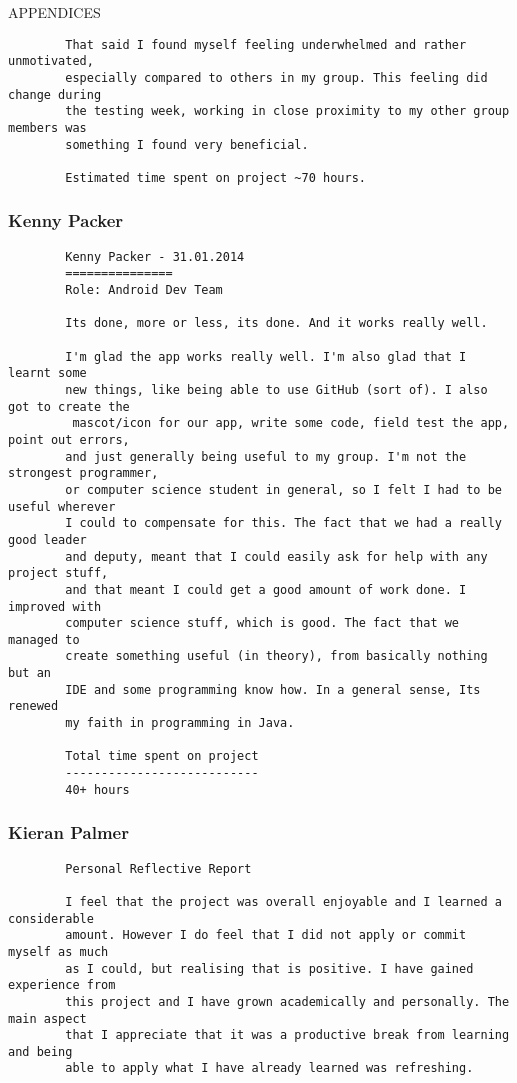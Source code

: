 \documentclass{article}
\begin{document}
\begin{section}{APPENDICES}
\begin{verbatim}
		That said I found myself feeling underwhelmed and rather unmotivated, 
		especially compared to others in my group. This feeling did change during 
		the testing week, working in close proximity to my other group members was 
		something I found very beneficial.

		Estimated time spent on project ~70 hours.

		\end{verbatim}
		
		\clearpage
		\subsubsection{Kenny Packer}
		\begin{verbatim}
		Kenny Packer - 31.01.2014
		===============
		Role: Android Dev Team

		Its done, more or less, its done. And it works really well.

		I'm glad the app works really well. I'm also glad that I learnt some 
		new things, like being able to use GitHub (sort of). I also got to create the
		 mascot/icon for our app, write some code, field test the app, point out errors,
		and just generally being useful to my group. I'm not the strongest programmer, 
		or computer science student in general, so I felt I had to be useful wherever 
		I could to compensate for this. The fact that we had a really good leader 
		and deputy,	meant that I could easily ask for help with any project stuff, 
		and that meant I could get a good amount of work done. I improved with 
		computer science stuff, which is good. The fact that we managed to 
		create something useful (in theory), from basically nothing but an 
		IDE and some programming know how. In a general sense, Its renewed 
		my faith in programming in Java. 
		
		Total time spent on project
		---------------------------
		40+ hours
		\end{verbatim}
		
		\clearpage
		\subsubsection{Kieran Palmer}
		\begin{verbatim}
		Personal Reflective Report

		I feel that the project was overall enjoyable and I learned a considerable
		amount. However I do feel that I did not apply or commit myself as much 
		as I could, but realising that is positive. I have gained experience from
		this project and I have grown academically and personally. The main aspect 
		that I appreciate that it was a productive break from learning and being 
		able to apply what I have already learned was refreshing.


\end{verbatim}
\end{section}
\end{document}
